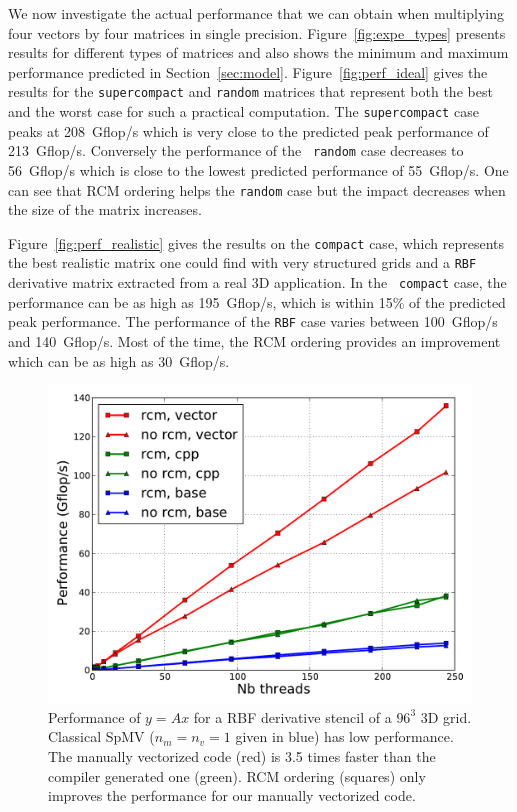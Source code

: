 \documentclass[10pt,conference,compsocconf]{IEEEtran}
\begin{document}
We now investigate the actual performance that we can obtain when
multiplying four vectors by four matrices in single
precision. Figure~\ref{fig:expe_types} presents results for different
types of matrices and also shows the minimum and maximum performance
predicted in Section~\ref{sec:model}. Figure~\ref{fig:perf_ideal}
gives the results for the {\tt supercompact} and {\tt random} matrices
that represent both the best and the worst case for such a practical 
computation. The {\tt supercompact} case peaks at
208~Gflop/s which is very close to the predicted peak
performance of 213~Gflop/s. Conversely the performance of the {\tt
  random} case decreases to 56~Gflop/s which is close to
the lowest predicted performance of 55~Gflop/s. One can see that RCM
ordering helps the {\tt random} case but the impact decreases when the
size of the matrix increases.

Figure~\ref{fig:perf_realistic} gives the results on the {\tt compact}
case, which represents the best realistic matrix one could find with very
structured grids and a
{\tt RBF} derivative matrix extracted from a real 3D application. In the {\tt
  compact} case, the performance can be as high as 195~Gflop/s, which is
within 15\% of the predicted  peak performance. The performance of the
{\tt RBF} case varies between 100~Gflop/s and 140~Gflop/s. Most of the
time, the RCM ordering provides an improvement which can be as high as
30~Gflop/s.

\begin{figure}[t]
  \centering 
  
  \includegraphics[width=.9\linewidth]{figures/mic_performance_nb_threads.pdf}

  \caption{Performance of $y=Ax$ for a RBF derivative stencil of a
    $96^3$ 3D grid. Classical SpMV ($n_m=n_v=1$ given in blue) has low
    performance. The manually vectorized code (red) is 3.5 times
    faster than the compiler generated one (green). RCM ordering
    (squares) only improves the performance for our manually
    vectorized code.}
  \label{fig:comparison_spmv}
  \label{fig:perf_mic}
\end{figure}
\end{document}
